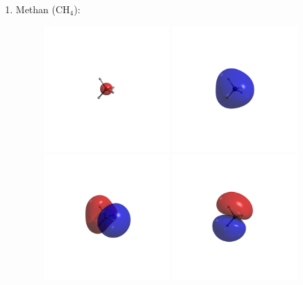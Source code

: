 \begin{enumerate}
\newpage
\item Methan (CH$_4$):
\begin{figure}[H]
\centering
\includegraphics[trim=1200 1200 1200 1200, clip, width=0.45\textwidth]{res/CH4/ch4_w0.png}
\includegraphics[trim=1200 1200 1200 1200, clip, width=0.45\textwidth]{res/CH4/ch4_w1.png}\\
\includegraphics[trim=1200 1200 1200 1200, clip, width=0.45\textwidth]{res/CH4/ch4_w2.png}
\includegraphics[trim=1200 1200 1200 1200, clip, width=0.45\textwidth]{res/CH4/ch4_w3.png}\\

\end{figure}
\end{enumerate}
